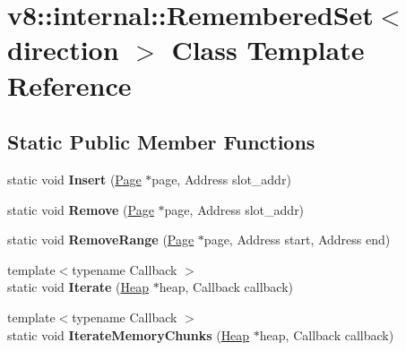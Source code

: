 \hypertarget{classv8_1_1internal_1_1_remembered_set}{}\section{v8\+:\+:internal\+:\+:Remembered\+Set$<$ direction $>$ Class Template Reference}
\label{classv8_1_1internal_1_1_remembered_set}
\subsection*{Static Public Member Functions}
\begin{DoxyCompactItemize}
\item 
static void {\bfseries Insert} (\hyperlink{classv8_1_1internal_1_1_page}{Page} $\ast$page, Address slot\+\_\+addr)\hypertarget{classv8_1_1internal_1_1_remembered_set_ae721fb19e9baf5bebd8b96e37ed2987d}{}\label{classv8_1_1internal_1_1_remembered_set_ae721fb19e9baf5bebd8b96e37ed2987d}

\item 
static void {\bfseries Remove} (\hyperlink{classv8_1_1internal_1_1_page}{Page} $\ast$page, Address slot\+\_\+addr)\hypertarget{classv8_1_1internal_1_1_remembered_set_a2a347fba16c22a806e884eb44d170e9f}{}\label{classv8_1_1internal_1_1_remembered_set_a2a347fba16c22a806e884eb44d170e9f}

\item 
static void {\bfseries Remove\+Range} (\hyperlink{classv8_1_1internal_1_1_page}{Page} $\ast$page, Address start, Address end)\hypertarget{classv8_1_1internal_1_1_remembered_set_aa4e6e912565dd2ded9fc15490bed58ce}{}\label{classv8_1_1internal_1_1_remembered_set_aa4e6e912565dd2ded9fc15490bed58ce}

\item 
{\footnotesize template$<$typename Callback $>$ }\\static void {\bfseries Iterate} (\hyperlink{classv8_1_1internal_1_1_heap}{Heap} $\ast$heap, Callback callback)\hypertarget{classv8_1_1internal_1_1_remembered_set_a56711887bc331612c1c5671775c77b39}{}\label{classv8_1_1internal_1_1_remembered_set_a56711887bc331612c1c5671775c77b39}

\item 
{\footnotesize template$<$typename Callback $>$ }\\static void {\bfseries Iterate\+Memory\+Chunks} (\hyperlink{classv8_1_1internal_1_1_heap}{Heap} $\ast$heap, Callback callback)\hypertarget{classv8_1_1internal_1_1_remembered_set_aa4675527277857a141fe3b10e4f3d94e}{}\label{classv8_1_1internal_1_1_remembered_set_aa4675527277857a141fe3b10e4f3d94e}


\end{DoxyCompactItemize}
